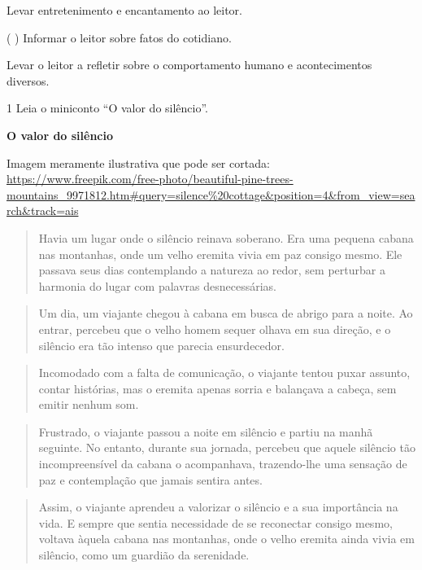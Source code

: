 \begin{itemize}
\begin{itemize}
 Levar entretenimento e encantamento ao leitor.

( ) Informar o leitor sobre fatos do cotidiano.

 Levar o leitor a refletir sobre o comportamento humano e
acontecimentos diversos.


\num{1} Leia o miniconto ``O valor do silêncio''.

\textbf{O valor do silêncio}

Imagem meramente ilustrativa que pode ser cortada:
\url{https://www.freepik.com/free-photo/beautiful-pine-trees-mountains_9971812.htm\#query=silence\%20cottage\&position=4\&from_view=search\&track=ais}

\begin{quote}
Havia um lugar onde o silêncio reinava soberano. Era uma pequena cabana
nas montanhas, onde um velho eremita vivia em paz consigo mesmo. Ele
passava seus dias contemplando a natureza ao redor, sem perturbar a
harmonia do lugar com palavras desnecessárias.
\end{quote}

\begin{quote}
Um dia, um viajante chegou à cabana em busca de abrigo para a noite. Ao
entrar, percebeu que o velho homem sequer olhava em sua direção, e o
silêncio era tão intenso que parecia ensurdecedor.
\end{quote}

\begin{quote}
Incomodado com a falta de comunicação, o viajante tentou puxar assunto,
contar histórias, mas o eremita apenas sorria e balançava a cabeça, sem
emitir nenhum som.
\end{quote}

\begin{quote}
Frustrado, o viajante passou a noite em silêncio e partiu na manhã
seguinte. No entanto, durante sua jornada, percebeu que aquele silêncio
tão incompreensível da cabana o acompanhava, trazendo-lhe uma sensação
de paz e contemplação que jamais sentira antes.
\end{quote}

\begin{quote}
Assim, o viajante aprendeu a valorizar o silêncio e a sua importância na
vida. E sempre que sentia necessidade de se reconectar consigo mesmo,
voltava àquela cabana nas montanhas, onde o velho eremita ainda vivia em
silêncio, como um guardião da serenidade.
\end{quote}


\end{itemize}
\end{itemize}

